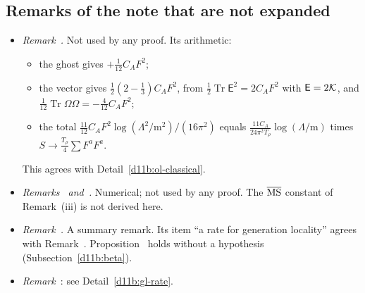 \subsection{Remarks of the note that are not expanded}\label{d11b:remarks}

\begin{itemize}
\item \emph{Remark~.} Not used by any proof. Its arithmetic:
  \begin{itemize}
  \item the ghost gives $+\frac1{12}C_AF^2$;
  \item the vector gives $\frac12(2-\frac13)C_AF^2$, from $\frac12\operatorname{Tr}\mathsf E^2=2C_AF^2$ with $\mathsf E=2\mathcal K$, and $\frac1{12}\operatorname{Tr}\Omega\Omega=-\frac4{12}C_AF^2$;
  \item the total $\frac{11}{12}C_AF^2\log(\Lambda^2/\mathrm m^2)/(16\pi^2)$ equals $\frac{11C_A}{24\pi^2T_\rho}\log(\Lambda/\mathrm m)$ times $S\to\frac{T_\rho}4\sum F^aF^a$.
  \end{itemize}
  This agrees with Detail~\ref{d11b:ol-classical}.
\item \emph{Remarks~ and~.} Numerical; not used by any proof. The $\overline{\rm MS}$ constant of Remark~(iii) is not derived here.
\item \emph{Remark~.} A summary remark. Its item ``a rate for generation locality'' agrees with Remark~. Proposition~ holds without a hypothesis (Subsection~\ref{d11b:beta}).
\item \emph{Remark~}: see Detail~\ref{d11b:gl-rate}.
\end{itemize}



